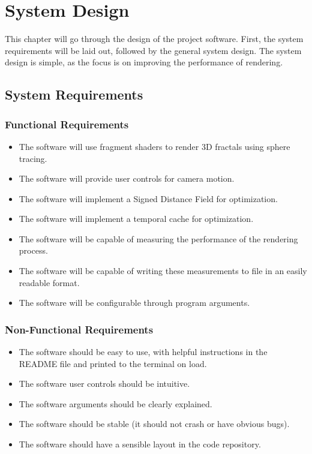 \chapter{System Design}
\label{chapter:system-design}

This chapter will go through the design of the project software. First, the system requirements will be laid out, followed by the general system design. The system design is simple, as the focus is on improving the performance of rendering.

\section{System Requirements}

\subsection{Functional Requirements}

\begin{itemize}
	\item The software will use fragment shaders to render 3D fractals using sphere tracing.
	\item The software will provide user controls for camera motion.
	\item The software will implement a Signed Distance Field for optimization.
	\item The software will implement a temporal cache for optimization.
	\item The software will be capable of measuring the performance of the rendering process.
	\item The software will be capable of writing these measurements to file in an easily readable format.
	\item The software will be configurable through program arguments.
\end{itemize}

\subsection{Non-Functional Requirements}

\begin{itemize}
	\item The software should be easy to use, with helpful instructions in the README file and printed to the terminal on load.
	\item The software user controls should be intuitive.
	\item The software arguments should be clearly explained.
	\item The software should be stable (it should not crash or have obvious bugs).
	\item The software should have a sensible layout in the code repository.
\end{itemize}

